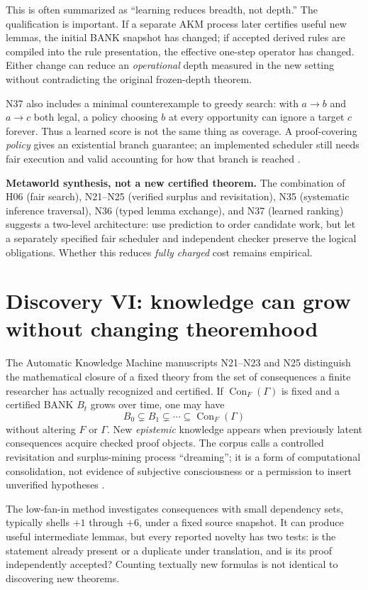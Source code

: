 \documentclass[11pt,letterpaper,oneside]{article}
\newcommand{\Con}{\operatorname{Con}}
\begin{document}
This is often summarized as ``learning reduces breadth, not depth.'' The qualification is important. If a separate AKM process later certifies useful new lemmas, the initial BANK snapshot has changed; if accepted derived rules are compiled into the rule presentation, the effective one-step operator has changed. Either change can reduce an \emph{operational} depth measured in the new setting without contradicting the original frozen-depth theorem.

N37 also includes a minimal counterexample to greedy search: with $a\to b$ and $a\to c$ both legal, a policy choosing $b$ at every opportunity can ignore a target $c$ forever. Thus a learned score is not the same thing as coverage. A proof-covering \emph{policy} gives an existential branch guarantee; an implemented scheduler still needs fair execution and valid accounting for how that branch is reached \cite{n37}.

\begin{insight}
\textbf{Metaworld synthesis, not a new certified theorem.} The combination of H06 (fair search), N21--N25 (verified surplus and revisitation), N35 (systematic inference traversal), N36 (typed lemma exchange), and N37 (learned ranking) suggests a two-level architecture: use prediction to order candidate work, but let a separately specified fair scheduler and independent checker preserve the logical obligations. Whether this reduces \emph{fully charged} cost remains empirical.
\end{insight}

\section{Discovery VI: knowledge can grow without changing theoremhood}
The Automatic Knowledge Machine manuscripts N21--N23 and N25 distinguish the mathematical closure of a fixed theory from the set of consequences a finite researcher has actually recognized and certified. If $\Con_F(\Gamma)$ is fixed and a certified BANK $B_t$ grows over time, one may have
\[
 B_0\subsetneq B_1\subsetneq\cdots\subseteq\Con_F(\Gamma)
\]
without altering $F$ or $\Gamma$. New \emph{epistemic} knowledge appears when previously latent consequences acquire checked proof objects. The corpus calls a controlled revisitation and surplus-mining process ``dreaming''; it is a form of computational consolidation, not evidence of subjective consciousness or a permission to insert unverified hypotheses \cite{akm}.

The low-fan-in method investigates consequences with small dependency sets, typically shells $+1$ through $+6$, under a fixed source snapshot. It can produce useful intermediate lemmas, but every reported novelty has two tests: is the statement already present or a duplicate under translation, and is its proof independently accepted? Counting textually new formulas is not identical to discovering new theorems.
\end{document}
